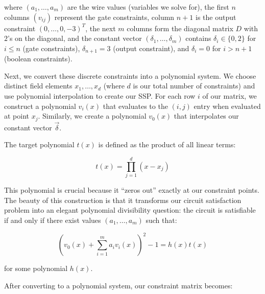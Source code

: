 where $(a_1,\ldots,a_m)$ are the wire values (variables we solve for), the first $n$ columns $(v_{ij})$ represent the gate constraints, column $n+1$ is the output constraint $(0,\ldots,0,-3)^T$, the next $m$ columns form the diagonal matrix $D$ with $2$'s on the diagonal, and the constant vector $(\delta_1,\ldots,\delta_m)$ contains $\delta_i \in \{0,2\}$ for $i \leq n$ (gate constraints), $\delta_{n+1} = 3$ (output constraint), and $\delta_i = 0$ for $i > n+1$ (boolean constraints).

Next, we convert these discrete constraints into a polynomial system. We choose distinct field elements $x_1,\ldots,x_d$ (where $d$ is our total number of constraints) and use polynomial interpolation to create our SSP. For each row $i$ of our matrix, we construct a polynomial $v_i(x)$ that evaluates to the $(i,j)$ entry when evaluated at point $x_j$. Similarly, we create a polynomial $v_0(x)$ that interpolates our constant vector $\vec{\delta}$.

The target polynomial $t(x)$ is defined as the product of all linear terms:

\[ t(x) = \prod_{j=1}^d (x-x_j) \]

This polynomial is crucial because it ``zeros out'' exactly at our constraint points. The beauty of this construction is that it transforms our circuit satisfaction problem into an elegant polynomial divisibility question: the circuit is satisfiable if and only if there exist values $(a_1,\ldots,a_m)$ such that:

\[ \left(v_0(x) + \sum_{i=1}^m a_i v_i(x)\right)^2 - 1 = h(x)t(x) \]

for some polynomial $h(x)$.

After converting to a polynomial system, our constraint matrix becomes:

